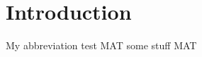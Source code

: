 \chapter{Introduction}
\label{chap:Introduction}


My abbreviation test \ac{MAT}
some stuff
\ac{MAT}
